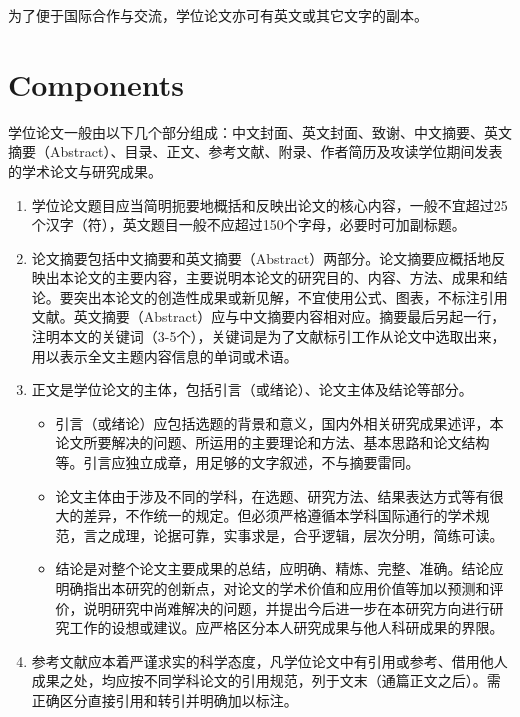 为了便于国际合作与交流，学位论文亦可有英文或其它文字的副本。

\section{Components}

学位论文一般由以下几个部分组成：中文封面、英文封面、致谢、中文摘要、英文摘要（Abstract）、目录、正文、参考文献、附录、作者简历及攻读学位期间发表的学术论文与研究成果。

\begin{enumerate}
  \item 学位论文题目应当简明扼要地概括和反映出论文的核心内容，一般不宜超过25个汉字（符），英文题目一般不应超过150个字母，必要时可加副标题。

  \item 论文摘要包括中文摘要和英文摘要（Abstract）两部分。论文摘要应概括地反映出本论文的主要内容，主要说明本论文的研究目的、内容、方法、成果和结论。要突出本论文的创造性成果或新见解，不宜使用公式、图表，不标注引用文献。英文摘要（Abstract）应与中文摘要内容相对应。摘要最后另起一行，注明本文的关键词（3-5个），关键词是为了文献标引工作从论文中选取出来，用以表示全文主题内容信息的单词或术语。

  \item 正文是学位论文的主体，包括引言（或绪论）、论文主体及结论等部分。
    \begin{itemize}
      \item 引言（或绪论）应包括选题的背景和意义，国内外相关研究成果述评，本论文所要解决的问题、所运用的主要理论和方法、基本思路和论文结构等。引言应独立成章，用足够的文字叙述，不与摘要雷同。

      \item 论文主体由于涉及不同的学科，在选题、研究方法、结果表达方式等有很大的差异，不作统一的规定。但必须严格遵循本学科国际通行的学术规范，言之成理，论据可靠，实事求是，合乎逻辑，层次分明，简练可读。

      \item 结论是对整个论文主要成果的总结，应明确、精炼、完整、准确。结论应明确指出本研究的创新点，对论文的学术价值和应用价值等加以预测和评价，说明研究中尚难解决的问题，并提出今后进一步在本研究方向进行研究工作的设想或建议。应严格区分本人研究成果与他人科研成果的界限。
    \end{itemize}

  \item 参考文献应本着严谨求实的科学态度，凡学位论文中有引用或参考、借用他人成果之处，均应按不同学科论文的引用规范，列于文末（通篇正文之后）。需正确区分直接引用和转引并明确加以标注。


\end{enumerate}
